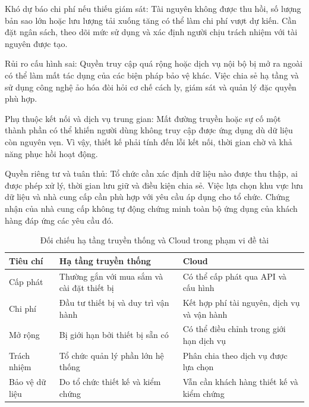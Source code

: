 Khó dự báo chi phí nếu thiếu giám sát: Tài nguyên không được thu hồi, số lượng bản sao lớn hoặc lưu lượng tải xuống tăng có thể làm chi phí vượt dự kiến. Cần đặt ngân sách, theo dõi mức sử dụng và xác định người chịu trách nhiệm với tài nguyên được tạo.

Rủi ro cấu hình sai: Quyền truy cập quá rộng hoặc dịch vụ nội bộ bị mở ra ngoài có thể làm mất tác dụng của các biện pháp bảo vệ khác. Việc chia sẻ hạ tầng và sử dụng công nghệ ảo hóa đòi hỏi cơ chế cách ly, giám sát và quản lý đặc quyền phù hợp.\cite{ccsp}

Phụ thuộc kết nối và dịch vụ trung gian: Mất đường truyền hoặc sự cố một thành phần có thể khiến người dùng không truy cập được ứng dụng dù dữ liệu còn nguyên vẹn. Vì vậy, thiết kế phải tính đến lỗi kết nối, thời gian chờ và khả năng phục hồi hoạt động.

Quyền riêng tư và tuân thủ: Tổ chức cần xác định dữ liệu nào được thu thập, ai được phép xử lý, thời gian lưu giữ và điều kiện chia sẻ. Việc lựa chọn khu vực lưu dữ liệu và nhà cung cấp cần phù hợp với yêu cầu áp dụng cho tổ chức. Chứng nhận của nhà cung cấp không tự động chứng minh toàn bộ ứng dụng của khách hàng đáp ứng các yêu cầu đó.

\begin{table}[htbp]
\centering\small
\caption{Đối chiếu hạ tầng truyền thống và Cloud trong phạm vi đề tài}
\begin{tabularx}{\textwidth}{@{}>{\raggedright\arraybackslash}p{2.8cm}XX@{}}
\toprule
\textbf{Tiêu chí} & \textbf{Hạ tầng truyền thống} & \textbf{Cloud} \\
\midrule
Cấp phát & Thường gắn với mua sắm và cài đặt thiết bị & Có thể cấp phát qua API và cấu hình \\
Chi phí & Đầu tư thiết bị và duy trì vận hành & Kết hợp phí tài nguyên, dịch vụ và vận hành \\
Mở rộng & Bị giới hạn bởi thiết bị sẵn có & Có thể điều chỉnh trong giới hạn dịch vụ \\
Trách nhiệm & Tổ chức quản lý phần lớn hệ thống & Phân chia theo dịch vụ được lựa chọn \\
Bảo vệ dữ liệu & Do tổ chức thiết kế và kiểm chứng & Vẫn cần khách hàng thiết kế và kiểm chứng \\
\bottomrule
\end{tabularx}
\end{table}

